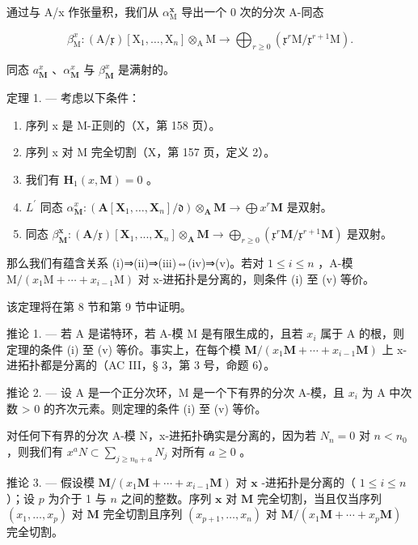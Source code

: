 通过与 A/x 作张量积，我们从 \(\alpha_{\mathrm{M}}^{\mathbf{x}}\) 导出一个 0 次的分次 A-同态

\[
\beta_ {\mathrm{M}} ^ {x}: (\mathrm{A} / \mathfrak {x}) [ \mathrm{X} _ {1}, \dots , \mathrm{X} _ {n} ] \otimes_ {\mathrm{A}} \mathrm{M} \rightarrow \bigoplus_ {r \geqslant 0} (\mathfrak {x} ^ {r} \mathrm{M} / \mathfrak {x} ^ {r + 1} \mathrm{M}).
\]

同态 \(a_{\mathbf{M}}^{x}\) 、\(\alpha_{\mathbf{M}}^{x}\) 与 \(\beta_{\mathbf{M}}^{x}\) 是满射的。

定理 1. --- 考虑以下条件：

\begin{enumerate}
\def\labelenumi{(\roman{enumi})}
\item
  序列 x 是 M-正则的（X，第 158 页）。
\item
  序列 x 对 M 完全切割（X，第 157 页，定义 2）。
\item
  我们有 \(\mathbf{H}_1(x, \mathbf{M}) = 0\) 。
\item
  \(L^{\prime}\) 同态 \(\alpha_{\mathbf{M}}^{x}:(\mathbf{A}[\mathbf{X}_{1},\dots,\mathbf{X}_{n}]/\mathfrak{d})\otimes_{\mathbf{A}}\mathbf{M}\to\bigoplus x^{r}\mathbf{M}\) 是双射。
\item
  同态 \(\beta_{\mathbf{M}}^{\mathbf{x}}:(\mathbf{A}/\mathfrak{x})[\mathbf{X}_{1},..., \mathbf{X}_{n}]\otimes_{\mathbf{A}}\mathbf{M}\to\bigoplus_{r\geqslant0}(\mathfrak{x}^{r}\mathbf{M}/\mathfrak{x}^{r+1}\mathbf{M})\) 是双射。
\end{enumerate}

那么我们有蕴含关系 (i)⇒(ii)⇒(iii)⇔(iv)⇒(v)。若对 \(1 \leqslant i \leqslant n\) ，A-模 \(\mathrm{M}/(x_{1}\mathrm{M} + \cdots + x_{i-1}\mathrm{M})\) 对 x-进拓扑是分离的，则条件 (i) 至 (v) 等价。

该定理将在第 8 节和第 9 节中证明。

推论 1. --- 若 A 是诺特环，若 A-模 M 是有限生成的，且若 \(x_{i}\) 属于 A 的根，则定理的条件 (i) 至 (v) 等价。事实上，在每个模 \(\mathbf{M}/(x_{1} \mathbf{M} + \cdots + x_{i-1} \mathbf{M})\) 上 x-进拓扑都是分离的（AC III，§ 3，第 3 号，命题 6）。

推论 2. --- 设 A 是一个正分次环，M 是一个下有界的分次 A-模，且 \(x_i\) 为 A 中次数 \textgreater{} 0 的齐次元素。则定理的条件 (i) 至 (v) 等价。

对任何下有界的分次 A-模 N，x-进拓扑确实是分离的，因为若 \(N_{n}=0\) 对 \(n<n_{0}\) ，则我们有 \(x^{a}N\subset\sum_{j\geqslant n_{0}+a}N_{j}\) 对所有 \(a\geqslant0\) 。

推论 3. --- 假设模 \(\mathbf{M}/(x_1\mathbf{M} + \cdots + x_{i-1}\mathbf{M})\) 对 \(\mathbf{x}\) -进拓扑是分离的（ \(1 \leqslant i \leqslant n\) ）；设 \(p\) 为介于 1 与 \(n\) 之间的整数。序列 \(\mathbf{x}\) 对 \(\mathbf{M}\) 完全切割，当且仅当序列 \((x_1, \ldots, x_p)\) 对 \(\mathbf{M}\) 完全切割且序列 \((x_{p+1}, \ldots, x_n)\) 对 \(\mathbf{M}/(x_1\mathbf{M} + \cdots + x_p\mathbf{M})\) 完全切割。

